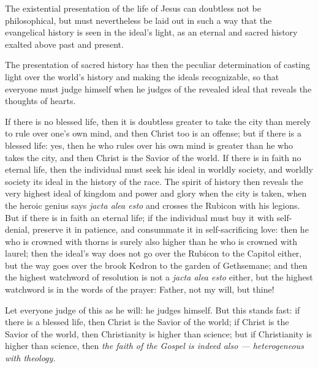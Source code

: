 \documentclass[12pt,a4paper]{book}
\begin{document}
The existential presentation of the life of Jesus can doubtless not be philosophical, but must
nevertheless be laid out in such a way that the evangelical history is seen in the ideal's
light, as an eternal and sacred history exalted above past and present.

The presentation of sacred history has then the peculiar determination of casting light over
the world's history and making the ideals recognizable, so that everyone must judge himself
when he judges of the revealed ideal that reveals the thoughts of hearts.

If there is no blessed life, then it is doubtless greater to take the city than merely to rule
over one's own mind, and then Christ too is an offense; but if there is a blessed life: yes,
then he who rules over his own mind is greater than he who takes the city, and then Christ is
the Savior of the world. If there is in faith no eternal life, then the individual must seek
his ideal in worldly society, and worldly society its ideal in the history of the race. The
spirit of history then reveals the very highest ideal of kingdom and power and glory when the
city is taken, when the heroic genius says \textit{jacta alea esto} and crosses the Rubicon
with his legions. But if there is in faith an eternal life; if the individual must buy it with
self-denial, preserve it in patience, and consummate it in self-sacrificing love: then he who
is crowned with thorns is surely also higher than he who is crowned with laurel; then the
ideal's way does not go over the Rubicon to the Capitol either, but the way goes over the brook
Kedron to the garden of Gethsemane; and then the highest watchword of resolution is
not a \textit{jacta alea esto} either, but the highest watchword is in the words of the prayer:
Father, not my will, but thine!

Let everyone judge of this as he will: he judges himself. But this stands fast: if there is a
blessed life, then Christ is the Savior of the world; if Christ is the Savior of the world,
then Christianity is higher than science; but if Christianity is higher than science, then
\emph{the faith of the Gospel is indeed also --- heterogeneous with theology.}
\end{document}
